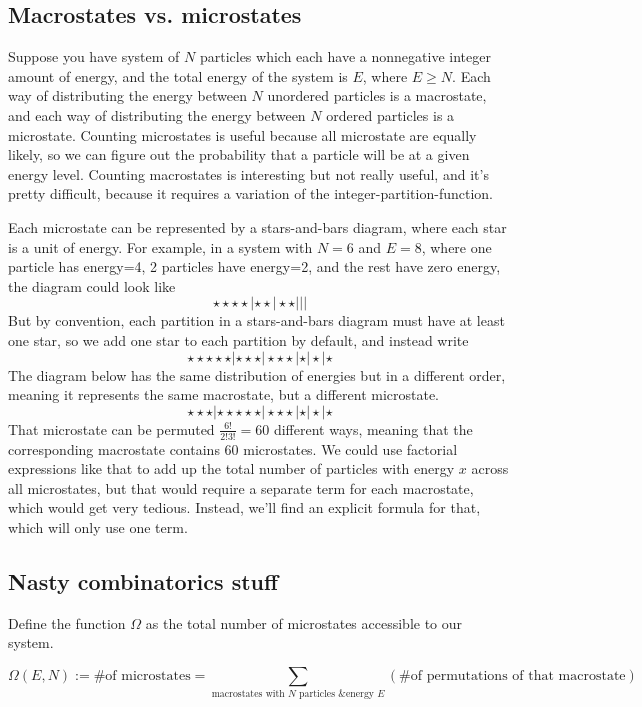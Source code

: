 \documentclass[12pt]{article}
\begin{document}
\subsection{Macrostates vs. microstates}
Suppose you have system of $N$ particles which each have a nonnegative integer amount of energy, and the total energy of the system is $E$, where $E \geq N$. Each way of distributing the energy between $N$ unordered particles is a macrostate, and each way of distributing the energy between $N$ ordered particles is a microstate. Counting microstates is useful because all microstate are equally likely, so we can figure out the probability that a particle will be at a given energy level. Counting macrostates is interesting but not really useful, and it's pretty difficult, because it requires a variation of the integer-partition-function.

Each microstate can be represented by a stars-and-bars diagram, where each star is a unit of energy. For example, in a system with $N=6$ and $E=8$, where one particle has energy=4, 2 particles have energy=2, and the rest have zero energy, the diagram could look like
\[\star \star \star \star | \star \star | \star \star | | |\]
But by convention, each partition in a stars-and-bars diagram must have at least one star, so we add one star to each partition by default, and instead write
\[\star \star \star \star \star | \star \star \star | \star \star \star | \star | \star | \star\]
The diagram below has the same distribution of energies but in a different order, meaning it represents the same macrostate, but a different microstate.
\[\star \star \star | \star \star \star \star \star | \star \star \star | \star | \star | \star\]
That microstate can be permuted $\frac{6!}{2!3!} = 60$ different ways, meaning that the corresponding macrostate contains 60 microstates. We could use factorial expressions like that to add up the total number of particles with energy $x$ across all microstates, but that would require a separate term for each macrostate, which would get very tedious. Instead, we'll find an explicit formula for that, which will only use one term.

\subsection{Nasty combinatorics stuff}
Define the function $\Omega$ as the total number of microstates accessible to our system.

\[\Omega(E, N) := \text{\# of microstates} = \sum_{\text{macrostates with $N$ particles \& energy $E$}} (\text{\# of permutations of that macrostate})\]
\end{document}
